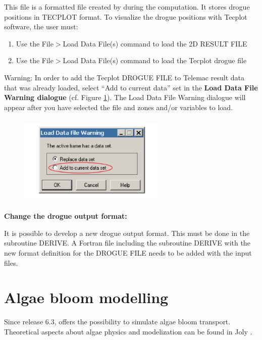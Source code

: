  This file is a formatted file created by  during the computation. It stores drogue positions in TECPLOT format. To visualize the drogue positions with Tecplot software, the user must:

\begin{enumerate}
\item  Use the File$>$Load Data File(s) command to load the 2D RESULT FILE

\item  Use the File$>$Load Data File(s) command to load the Tecplot drogue file
\end{enumerate}

\begin{WarningBlock}{Warning:}
 In order to add the Tecplot DROGUE FILE to Telemac result data that was already loaded, select ``Add to current data'' set in the \textbf{Load Data File Warning dialogue} (cf. Figure \ref{fig:load:df}). The Load Data File Warning dialogue will appear after you have selected the file and zones and/or variables to load.
\end{WarningBlock}
\begin{figure}
\centering
 \includegraphics[width=2.77in, height=1.70in, keepaspectratio=false]{./graphics/warning1.png}
\label{fig:load:df}
\end{figure}

 \textbf{Change the drogue output format:}

 It is possible to develop a new drogue output format. This must be done in the subroutine DERIVE. A Fortran file including the subroutine DERIVE with the new format definition for the DROGUE FILE needs to be added with the input files.


\section{ Algae bloom modelling}
\label{sec:algae:bloom}
 Since release 6.3,  offers the possibility to simulate algae bloom transport. Theoretical aspects about algae physics and modelization can be found in Joly \cite{Joly2011}.



